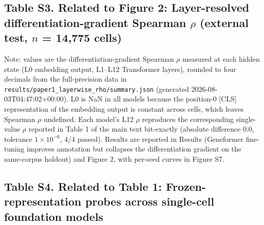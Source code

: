 \documentclass[12pt,a4paper]{article}
\begin{document}
\subsection*{Table S3. Related to Figure 2: Layer-resolved differentiation-gradient Spearman $\rho$ (external test, $n$ = 14,775 cells)}
\label{tab:S3}

\begingroup
\small
\centering
{}
\endgroup

Note: values are the differentiation-gradient Spearman $\rho$ measured at each hidden state (L0 embedding output, L1--L12 Transformer layers), rounded to four decimals from the full-precision data in \texttt{results/paper1\_layerwise\_rho/summary.json} (generated 2026-08-03T04:47:02+00:00). L0 is NaN in all models because the position-0 [CLS] representation of the embedding output is constant across cells, which leaves Spearman $\rho$ undefined. Each model's L12 $\rho$ reproduces the corresponding single-value $\rho$ reported in Table 1 of the main text bit-exactly (absolute difference 0.0, tolerance $1 \times 10^{-6}$, 4/4 passed). Results are reported in Results (Geneformer fine-tuning improves annotation but collapses the differentiation gradient on the same-corpus holdout) and Figure 2, with per-seed curves in Figure S7.

\needspace{45mm}
\subsection*{Table S4. Related to Table 1: Frozen-representation probes across single-cell foundation models}
\label{tab:S4}
\end{document}
